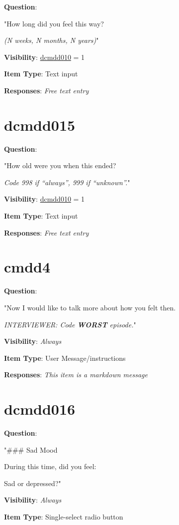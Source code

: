 \documentclass[
]{book}
\begin{document}
\textbf{Question}:

"How long did you feel this way?

\emph{(N weeks, N months, N years)}"

\textbf{Visibility}: \protect\hyperlink{dcmdd010}{dcmdd010} = 1

\textbf{Item Type}: Text input

\textbf{Responses}: \emph{Free text entry}

\hypertarget{dcmdd015}{%
\section{dcmdd015}\label{dcmdd015}}

\textbf{Question}:

"How old were you when this ended?

\emph{Code 998 if ``always'', 999 if ``unknown''.}"

\textbf{Visibility}: \protect\hyperlink{dcmdd010}{dcmdd010} = 1

\textbf{Item Type}: Text input

\textbf{Responses}: \emph{Free text entry}

\hypertarget{cmdd4}{%
\section{cmdd4}\label{cmdd4}}

\textbf{Question}:

"Now I would like to talk more about how you felt then.

\emph{INTERVIEWER: Code \textbf{WORST} episode.}"

\textbf{Visibility}: \emph{Always}

\textbf{Item Type}: User Message/instructions

\textbf{Responses}: \emph{This item is a markdown message}

\hypertarget{dcmdd016}{%
\section{dcmdd016}\label{dcmdd016}}

\textbf{Question}:

"\#\#\# Sad Mood

During this time, did you feel:

Sad or depressed?"

\textbf{Visibility}: \emph{Always}

\textbf{Item Type}: Single-select radio button
\end{document}
